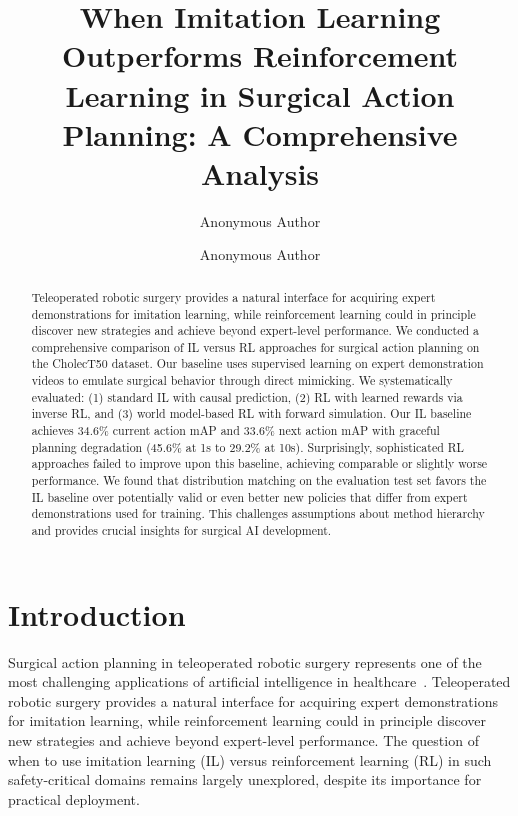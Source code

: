 \documentclass[runningheads]{llncs}
\begin{document}
\title{When Imitation Learning Outperforms Reinforcement Learning in Surgical Action Planning: A Comprehensive Analysis}

\author{Anonymous Author \and
Anonymous Author}



\maketitle


\begin{abstract}
Teleoperated robotic surgery provides a natural interface for acquiring expert demonstrations for imitation learning, while reinforcement learning could in principle discover new strategies and achieve beyond expert-level performance. We conducted a comprehensive comparison of IL versus RL approaches for surgical action planning on the CholecT50 dataset. Our baseline uses supervised learning on expert demonstration videos to emulate surgical behavior through direct mimicking. We systematically evaluated: (1) standard IL with causal prediction, (2) RL with learned rewards via inverse RL, and (3) world model-based RL with forward simulation. Our IL baseline achieves 34.6\% current action mAP and 33.6\% next action mAP with graceful planning degradation (45.6\% at 1s to 29.2\% at 10s). Surprisingly, sophisticated RL approaches failed to improve upon this baseline, achieving comparable or slightly worse performance. We found that distribution matching on the evaluation test set favors the IL baseline over potentially valid or even better new policies that differ from expert demonstrations used for training. This challenges assumptions about method hierarchy and provides crucial insights for surgical AI development.

\end{abstract}


\section{Introduction}

Surgical action planning in teleoperated robotic surgery represents one of the most challenging applications of artificial intelligence in healthcare~\cite{nwoye2022cholect50}. Teleoperated robotic surgery provides a natural interface for acquiring expert demonstrations for imitation learning, while reinforcement learning could in principle discover new strategies and achieve beyond expert-level performance. The question of when to use imitation learning (IL) versus reinforcement learning (RL) in such safety-critical domains remains largely unexplored, despite its importance for practical deployment.
\end{document}

